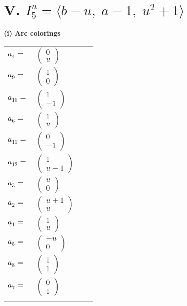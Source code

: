 \documentclass[1p]{elsarticle_modified}
\theoremstyle{definition}
\begin{document}
\centering \section*{V. $I^u_{5}= \langle b- u,\;a-1,\;u^2+1 \rangle$}
\flushleft \textbf{(i) Arc colorings}\\
\begin{tabular}{m{7pt} m{180pt} m{7pt} m{180pt} }
\flushright $a_{4}=$&$\begin{pmatrix}0\\u\end{pmatrix}$ \\
\flushright $a_{9}=$&$\begin{pmatrix}1\\0\end{pmatrix}$ \\
\flushright $a_{10}=$&$\begin{pmatrix}1\\-1\end{pmatrix}$ \\
\flushright $a_{6}=$&$\begin{pmatrix}1\\u\end{pmatrix}$ \\
\flushright $a_{11}=$&$\begin{pmatrix}0\\-1\end{pmatrix}$ \\
\flushright $a_{12}=$&$\begin{pmatrix}1\\u-1\end{pmatrix}$ \\
\flushright $a_{3}=$&$\begin{pmatrix}u\\0\end{pmatrix}$ \\
\flushright $a_{2}=$&$\begin{pmatrix}u+1\\u\end{pmatrix}$ \\
\flushright $a_{1}=$&$\begin{pmatrix}1\\u\end{pmatrix}$ \\
\flushright $a_{5}=$&$\begin{pmatrix}- u\\0\end{pmatrix}$ \\
\flushright $a_{8}=$&$\begin{pmatrix}1\\1\end{pmatrix}$ \\
\flushright $a_{7}=$&$\begin{pmatrix}0\\1\end{pmatrix}$\\&\end{tabular}
\end{document}
